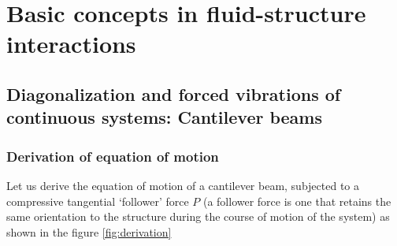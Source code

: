
\chapter{Basic concepts in fluid-structure interactions}
\section{Diagonalization and forced vibrations of continuous systems: Cantilever beams}
\subsection{Derivation of equation of motion}
Let us derive the equation of motion of a cantilever beam, subjected to a compressive tangential `follower' force $P$ (a follower force is one that retains the same orientation to the structure during the course of motion of the system) as shown in the figure \ref{fig:derivation}

